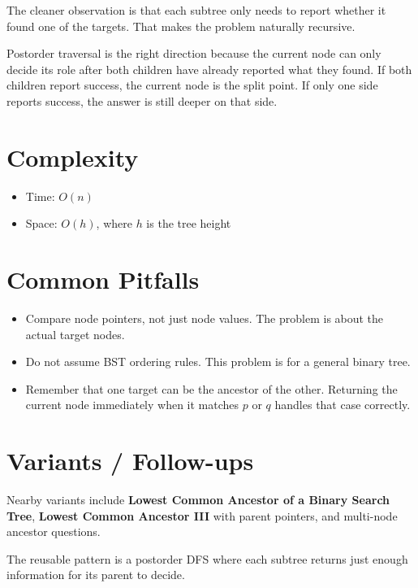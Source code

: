 The cleaner observation is that each subtree only needs to report whether it found one of the targets. That makes the problem naturally recursive.

Postorder traversal is the right direction because the current node can only decide its role after both children have already reported what they found. If both children report success, the current node is the split point. If only one side reports success, the answer is still deeper on that side.

\section{Complexity}
\begin{itemize}
\item Time: \(O(n)\)
\item Space: \(O(h)\), where \(h\) is the tree height
\end{itemize}

\section{Common Pitfalls}
\begin{itemize}
\item Compare node pointers, not just node values. The problem is about the actual target nodes.
\item Do not assume BST ordering rules. This problem is for a general binary tree.
\item Remember that one target can be the ancestor of the other. Returning the current node immediately when it matches \(p\) or \(q\) handles that case correctly.
\end{itemize}

\section{Variants / Follow-ups}
Nearby variants include \textbf{Lowest Common Ancestor of a Binary Search Tree}, \textbf{Lowest Common Ancestor III} with parent pointers, and multi-node ancestor questions.

The reusable pattern is a postorder DFS where each subtree returns just enough information for its parent to decide.
